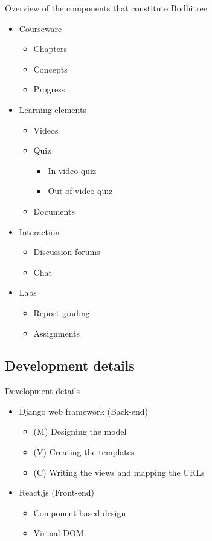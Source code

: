 \documentclass[xcolor=table]{beamer}
\begin{document}
\begin{frame}{Overview of the components that constitute Bodhitree}
  	\begin{itemize}
  		\item Courseware
  		\begin{itemize}
  			\item Chapters
  			\item Concepts
  			\item Progress
  		\end{itemize}
		\item Learning elements
		\begin{itemize}
  			\item Videos
	 		\item Quiz
	 		\begin{itemize}
	 			\item In-video quiz
	 			\item Out of video quiz
	 		\end{itemize}
	 		\item Documents			
		\end{itemize}	
  		\item Interaction
  		\begin{itemize}
  			\item Discussion forums
  			\item Chat
  		\end{itemize}
  		\item Labs
  		\begin{itemize}
	  		\item Report grading
	  		\item Assignments
  		\end{itemize}
  	\end{itemize}
\end{frame}

\subsection{Development details}

\begin{frame}{Development details}
	\begin{itemize}
		\item Django web framework (Back-end)
		\begin{itemize}
			\item (M) Designing the model
			\item (V) Creating the templates
			\item (C) Writing the views and mapping the URLs
		\end{itemize}
		\vspace{0.2in}
		\item React.js (Front-end)
		\begin{itemize}
			\item Component based design
			\item Virtual DOM
		\end{itemize}
	\end{itemize}
\end{frame}
\end{document}
